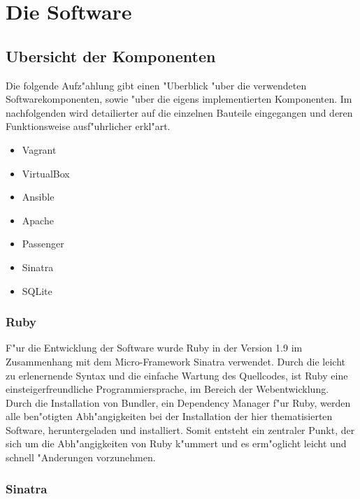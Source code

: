 \setcounter{secnumdepth}{3}
\chapter{Die Software}

\section{Ubersicht der Komponenten}
Die folgende Aufz"ahlung gibt einen "Uberblick "uber die verwendeten Softwarekomponenten, sowie "uber die eigens implementierten Komponenten.
Im nachfolgenden wird detailierter auf die einzelnen Bauteile eingegangen und deren Funktionsweise ausf"uhrlicher erkl"art.
\begin{itemize}
      \item Vagrant
      \item VirtualBox
      \item Ansible
      \item Apache
      \item Passenger
      \item Sinatra
      \item SQLite
 \end{itemize}

\subsection{Ruby}
F"ur die Entwicklung der Software wurde Ruby in der Version 1.9 im Zusammenhang mit dem Micro-Framework Sinatra verwendet.
Durch die leicht zu erlenernende Syntax und die einfache Wartung des Quellcodes, ist Ruby eine einsteigerfreundliche Programmiersprache, im Bereich der Webentwicklung.\newline 
Durch die Installation von Bundler, ein Dependency Manager f"ur Ruby, werden alle ben"otigten Abh"angigkeiten bei der Installation der hier thematisierten Software, heruntergeladen und installiert.
Somit entsteht ein zentraler Punkt, der sich um die Abh"angigkeiten von Ruby k"ummert und es erm"oglicht leicht und schnell "Anderungen vorzunehmen.

\subsection{Sinatra}



